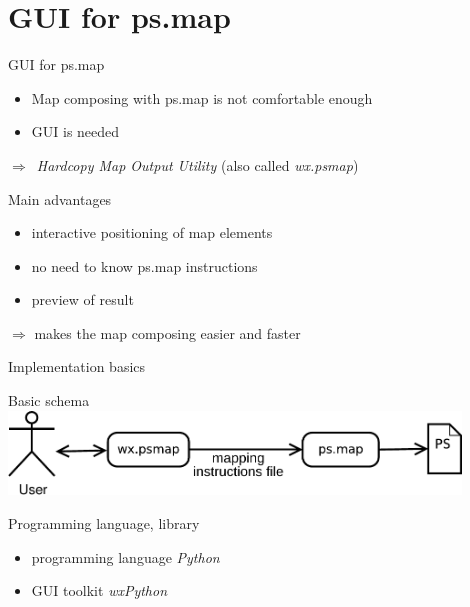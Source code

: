 \documentclass[xcolor=dvipsnames,beamer,compress]{beamer} %
\newcommand{\roztazeneradky}{%
\renewcommand{\baselinestretch}{1.3}%
\selectfont
}
\begin{document}
\section{GUI for ps.map}
\begin{frame}{GUI for ps.map}
\begin{itemize}
\item Map composing with ps.map is not comfortable enough
\item GUI is needed
\end{itemize}
\hspace*{1cm} $\Rightarrow$\ \emph{Hardcopy Map Output Utility} (also called \emph{wx.psmap})

\begin{block}{Main advantages}
\begin{itemize}
\item interactive positioning of map elements
\item no need to know ps.map instructions
\item preview of result
\end{itemize}
\end{block}

\hspace*{1cm} $\Rightarrow$ makes the map composing easier and faster
\end{frame}

\begin{frame}{Implementation basics}
\begin{block}{Basic schema}
\includegraphics[width=0.9\textwidth]{./diagram.pdf}
\end{block}
\bigskip
\begin{block}{Programming language, library}
\begin{itemize}
\item programming language \emph{Python}
\item GUI toolkit  \emph{wxPython}
\end{itemize}
\end{block}
\end{frame}
\end{document}

